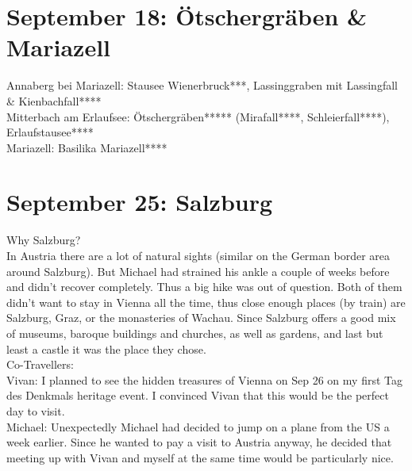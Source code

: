 {\section{September 18: \"Otschergr\"aben \& Mariazell}
\label{2021Geiselwind}

Annaberg bei Mariazell: Stausee Wienerbruck***, Lassinggraben mit Lassingfall \& Kienbachfall****\\
Mitterbach am Erlaufsee: \"Otschergr\"aben***** (Mirafall****, Schleierfall****), Erlaufstausee****\\
Mariazell: Basilika Mariazell****

\section{September 25: Salzburg}
\label{2021SalzburgII}

Why Salzburg?\\
In Austria there are a lot of natural sights (similar on the German border area around Salzburg). But Michael had strained his ankle a couple of weeks before and didn't recover completely. Thus a big hike was out of question. Both of them didn't want to stay in Vienna all the time, thus close enough places (by train) are Salzburg, Graz, or the monasteries of Wachau. Since Salzburg offers a good mix of museums, baroque buildings and churches, as well as gardens, and last but least a castle it was the place they chose.\\

Co-Travellers:\\
Vivan: I planned to see the hidden treasures of Vienna on Sep 26 on my first Tag des Denkmals heritage event. I convinced Vivan that this would be the perfect day to visit.\\
Michael: Unexpectedly Michael had decided to jump on a plane from the US a week earlier. Since he wanted to pay a visit to Austria anyway, he decided that meeting up with Vivan and myself at the same time would be particularly nice.\\

}
